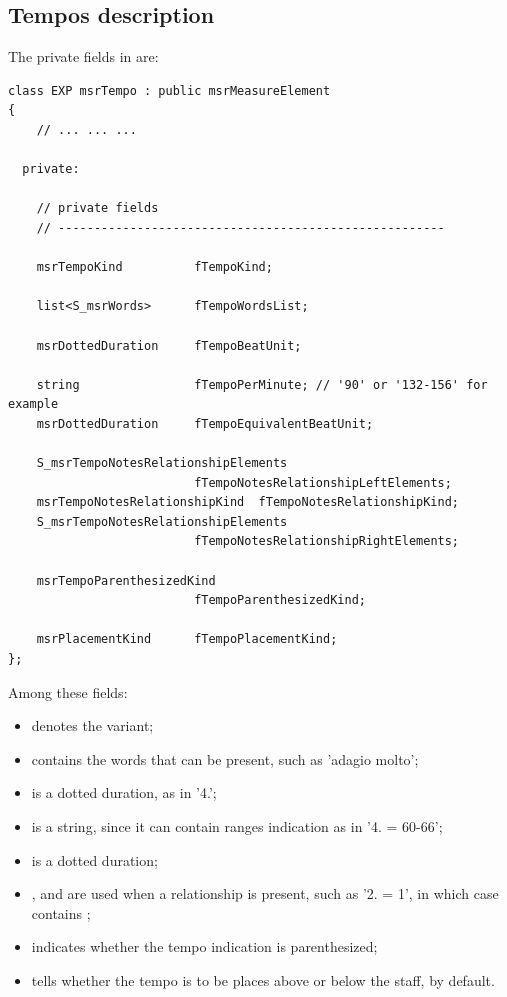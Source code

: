 \subsection{Tempos description}\label{Tempos description}

The private fields in  are:
\begin{lstlisting}[language=CPlusPlus]
class EXP msrTempo : public msrMeasureElement
{
	// ... ... ...

  private:

    // private fields
    // ------------------------------------------------------

    msrTempoKind          fTempoKind;

    list<S_msrWords>      fTempoWordsList;

    msrDottedDuration     fTempoBeatUnit;

    string                fTempoPerMinute; // '90' or '132-156' for example
    msrDottedDuration     fTempoEquivalentBeatUnit;

    S_msrTempoNotesRelationshipElements
                          fTempoNotesRelationshipLeftElements;
    msrTempoNotesRelationshipKind  fTempoNotesRelationshipKind;
    S_msrTempoNotesRelationshipElements
                          fTempoNotesRelationshipRightElements;

    msrTempoParenthesizedKind
                          fTempoParenthesizedKind;

    msrPlacementKind      fTempoPlacementKind;
};
\end{lstlisting}

Among these fields:
\begin{itemize}
\item {} denotes the variant;
\item {} contains the words that can be present, such as 'adagio molto';
\item {} is a dotted duration, as in '4.';
\item {} is a string, since it can contain ranges indication as in '4. = 60-66';
\item {} is a dotted duration; %
\item {},  and  are used when a relationship is present, such as '2. = 1', in which case  contains ;
\item {} indicates whether the tempo indication is parenthesized;
\item {} tells whether the tempo is to be places above or below the staff,  by default.
\end{itemize}



